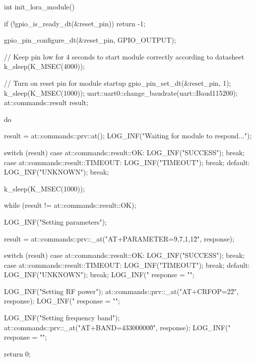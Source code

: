 \begin{cpp}
int init_lora_module()
{
    if (!gpio_is_ready_dt(&reset_pin))
    {
        return -1;
    }

    gpio_pin_configure_dt(&reset_pin, GPIO_OUTPUT);

    // Keep pin low for 4 seconds to start module correctly according to datasheet
    k_sleep(K_MSEC(4000));

    // Turn on reset pin for module startup
    gpio_pin_set_dt(&reset_pin, 1);
    k_sleep(K_MSEC(1000));
    uart::uart0::change_baudrate(uart::Baud115200);
    at::commands::result result;

    do
    {
        result = at::commands::prv::at();
        LOG_INF("Waiting for module to respond...");

        switch (result)
        {
        case at::commands::result::OK:
            LOG_INF("SUCCESS");
            break;
        case at::commands::result::TIMEOUT:
            LOG_INF("TIMEOUT");
            break;
        default:
            LOG_INF("UNKNOWN");
            break;
        }
        
        k_sleep(K_MSEC(1000));

    } while (result != at::commands::result::OK);

    LOG_INF("Setting parameters");

    result = at::commands::prv::_at("AT+PARAMETER=9,7,1,12\r\n", response);

    switch (result)
    {
    case at::commands::result::OK:
        LOG_INF("SUCCESS");
        break;
    case at::commands::result::TIMEOUT:
        LOG_INF("TIMEOUT");
        break;
    default:
        LOG_INF("UNKNOWN");
        break;
    }
    LOG_INF("%
    response = "";

    LOG_INF("Setting RF power");
    at::commands::prv::_at("AT+CRFOP=22\r\n", response);
    LOG_INF("%
    response = "";

    LOG_INF("Setting frequency band");
    at::commands::prv::_at("AT+BAND=433000000\r\n", response);
    LOG_INF("%
    response = "";
    
    return 0;
}

\end{cpp}

